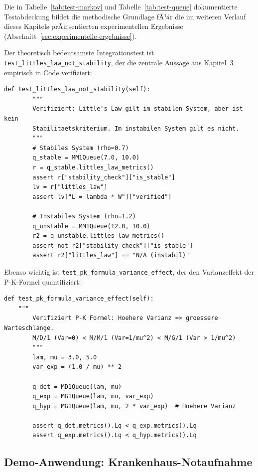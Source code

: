 ﻿\documentclass[a4paper,12pt]{report}
\theoremstyle{definition}
\begin{document}
Die in Tabelle~\ref{tab:test-markov} und Tabelle~\ref{tab:test-queue} dokumentierte Testabdeckung bildet die methodische Grundlage fÃ¼r die im weiteren Verlauf dieses Kapitels prÃ¤sentierten experimentellen Ergebnisse (Abschnitt~\ref{sec:experimentelle-ergebnisse}).

Der theoretisch bedeutsamste Integrationstest ist
\texttt{test\_lit\-tles\_law\_not\_sta\-bility}, der die zentrale Aussage
aus Kapitel~3 empirisch in Code verifiziert:

\begin{lstlisting}[style=python, caption={Test: Little's Law ist kein StabilitÃ¤tskriterium (empirische Verifikation)}, label=lst:test-littles-not-stability]
def test_littles_law_not_stability(self):
        """
        Verifiziert: Little's Law gilt im stabilen System, aber ist kein
        Stabilitaetskriterium. Im instabilen System gilt es nicht.
        """
        # Stabiles System (rho=0.7)
        q_stable = MM1Queue(7.0, 10.0)
        r = q_stable.littles_law_metrics()
        assert r["stability_check"]["is_stable"]
        lv = r["littles_law"]
        assert lv["L = lambda * W"]["verified"]

        # Instabiles System (rho=1.2)
        q_unstable = MM1Queue(12.0, 10.0)
        r2 = q_unstable.littles_law_metrics()
        assert not r2["stability_check"]["is_stable"]
        assert r2["littles_law"] == "N/A (instabil)"
\end{lstlisting}

Ebenso wichtig ist \texttt{test\_pk\_formula\_variance\_effect}, der den
Varianzeffekt der P-K-Formel quantifiziert:

\begin{lstlisting}[style=python, caption={Test: P-K-Formel -- hÃ¶here Varianz ergibt lÃ¤ngere Warteschlange}, label=lst:test-pk]
def test_pk_formula_variance_effect(self):
	"""
        Verifiziert P-K Formel: Hoehere Varianz => groessere Warteschlange.
        M/D/1 (Var=0) < M/M/1 (Var=1/mu^2) < M/G/1 (Var > 1/mu^2)
        """
        lam, mu = 3.0, 5.0
        var_exp = (1.0 / mu) ** 2

        q_det = MD1Queue(lam, mu)
        q_exp = MG1Queue(lam, mu, var_exp)
        q_hyp = MG1Queue(lam, mu, 2 * var_exp)  # Hoehere Varianz

        assert q_det.metrics().Lq < q_exp.metrics().Lq
        assert q_exp.metrics().Lq < q_hyp.metrics().Lq
\end{lstlisting}

\subsection{Demo-Anwendung: Krankenhaus-Notaufnahme}
\label{sec:demo-krankenhaus-system}
\end{document}
